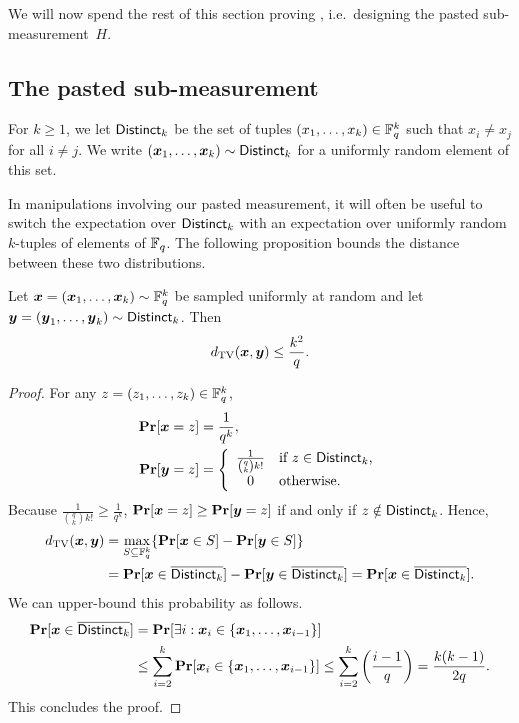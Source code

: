 We will now spend the rest of this section proving ,
i.e.\ designing the pasted sub-measurement~$H$.

\subsection{The pasted sub-measurement}

\begin{definition}
For $k \geq 1$, we let $\mathsf{Distinct}_{k}$ be the set of tuples $(x_1, \ldots, x_k) \in \mathbb F_q^k$ such that $x_i \neq x_j$ for all $i \neq j$.
We write $({\boldsymbol{x}}_1, \ldots, {\boldsymbol{x}}_k) \sim \mathsf{Distinct}_{k}$ for a uniformly random element of this set.
\end{definition}


In manipulations involving our pasted measurement, it will often be useful to switch
the expectation over $ \mathsf{Distinct}_{k}$ with an expectation over uniformly
random $k$-tuples of elements of $\mathbb F_q$. The following proposition
bounds the distance between these two distributions.

\begin{proposition}\label{prop:ld-dnoteq}
Let ${\boldsymbol{x}} = ({\boldsymbol{x}}_1, \ldots, {\boldsymbol{x}}_k) \sim \mathbb F_q^k$ be sampled uniformly at random
and let $\boldsymbol{y} = (\boldsymbol{y}_1, \ldots, \boldsymbol{y}_k) \sim \mathsf{Distinct}_{k}$.
Then
\begin{equation*}
d_{\mathrm{TV}}({\boldsymbol{x}}, \boldsymbol{y}) \leq \frac{k^2}{q}.
\end{equation*}
\end{proposition}
\begin{proof}
For any $z = (z_1, \ldots, z_k) \in \mathbb F_q^k$, 
\begin{align*}
\mathop{\bf Pr\/}[{\boldsymbol{x}} = z] 
& = \frac{1}{q^k},\\
\mathop{\bf Pr\/}[\boldsymbol{y} = z] 
& = \left\{\begin{array}{cl}
		\frac{1}{\binom{q}{k} k!} & \text{if $z \in \mathsf{Distinct}_{k}$,}\\
		0 & \text{otherwise.}
		\end{array}\right.
\end{align*}
Because $\frac{1}{\binom{q}{k} k!} \geq \frac{1}{q^k}$, $\mathop{\bf Pr\/}[{\boldsymbol{x}} = z] \geq \mathop{\bf Pr\/}[\boldsymbol{y} = z]$ if and only if $z \notin \mathsf{Distinct}_{k}$.
Hence,
\begin{align*}
d_{\mathrm{TV}}({\boldsymbol{x}}, \boldsymbol{y})
&= \max_{S \subseteq \mathbb F_q^k}\{\mathop{\bf Pr\/}[{\boldsymbol{x}} \in S] - \mathop{\bf Pr\/}[\boldsymbol{y} \in S]\}\\
&= \mathop{\bf Pr\/}[{\boldsymbol{x}} \in \overline{\mathsf{Distinct}_{k}}] - \mathop{\bf Pr\/}[\boldsymbol{y} \in \overline{\mathsf{Distinct}_{k}}]
= \mathop{\bf Pr\/}[{\boldsymbol{x}} \in \overline{\mathsf{Distinct}_{k}}].
\end{align*}
We can upper-bound this probability as follows.
\begin{align*}
\mathop{\bf Pr\/}[{\boldsymbol{x}} \in \overline{\mathsf{Distinct}_{k}}]
&= \mathop{\bf Pr\/}[\exists i : {\boldsymbol{x}}_i \in \{{\boldsymbol{x}}_1, \ldots, {\boldsymbol{x}}_{i-1}\}]\\
&\leq \sum_{i=2}^k \mathop{\bf Pr\/}[{\boldsymbol{x}}_i \in \{{\boldsymbol{x}}_1, \ldots, {\boldsymbol{x}}_{i-1}\}]
\leq \sum_{i=2}^k \left(\frac{i-1}{q}\right)
= \frac{k(k-1)}{2q}.
\end{align*}
This concludes the proof.
\end{proof}

